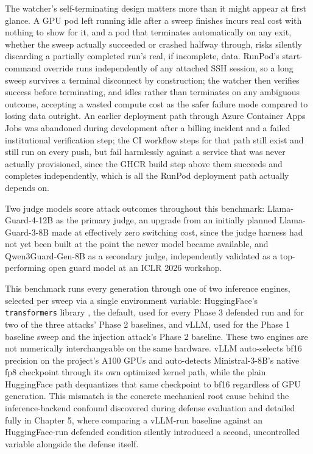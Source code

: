 The watcher's self-terminating design matters more than it might appear
at first glance. A GPU pod left running idle after a sweep finishes
incurs real cost with nothing to show for it, and a pod that terminates
automatically on any exit, whether the sweep actually succeeded or
crashed halfway through, risks silently discarding a partially completed
run's real, if incomplete, data. RunPod's start-command override runs
independently of any attached SSH session, so a long sweep survives a
terminal disconnect by construction; the watcher then verifies success
before terminating, and idles rather than terminates on any ambiguous
outcome, accepting a wasted compute cost as the safer failure mode
compared to losing data outright. An earlier deployment path through
Azure Container Apps Jobs was abandoned during development after a
billing incident and a failed institutional verification step; the CI
workflow steps for that path still exist and still run on every push,
but fail harmlessly against a service that was never actually
provisioned, since the GHCR build step above them succeeds and completes
independently, which is all the RunPod deployment path actually depends
on.

Two judge models score attack outcomes throughout this benchmark:
Llama-Guard-4-12B \citep{metaai2025llamaguard4} as the primary judge, an
upgrade from an initially planned Llama-Guard-3-8B made at effectively
zero switching cost, since the judge harness had not yet been built at
the point the newer model became available, and Qwen3Guard-Gen-8B as a
secondary judge, independently validated as a top-performing open guard
model at an ICLR 2026 workshop.

This benchmark runs every generation through one of two inference
engines, selected per sweep via a single environment variable:
HuggingFace's \texttt{transformers} library \citep{huggingface2016hub},
the default, used for every Phase 3 defended run and for two of the
three attacks' Phase 2 baselines, and vLLM, used for the Phase 1
baseline sweep and the injection attack's Phase 2 baseline. These two
engines are not numerically interchangeable on the same hardware. vLLM
auto-selects bf16 precision on the project's A100 GPUs and auto-detects
Ministral-3-8B's native fp8 checkpoint through its own optimized kernel
path, while the plain HuggingFace path dequantizes that same checkpoint
to bf16 regardless of GPU generation. This mismatch is the concrete
mechanical root cause behind the inference-backend confound discovered
during defense evaluation and detailed fully in Chapter 5, where
comparing a vLLM-run baseline against an HuggingFace-run defended
condition silently introduced a second, uncontrolled variable alongside
the defense itself.

